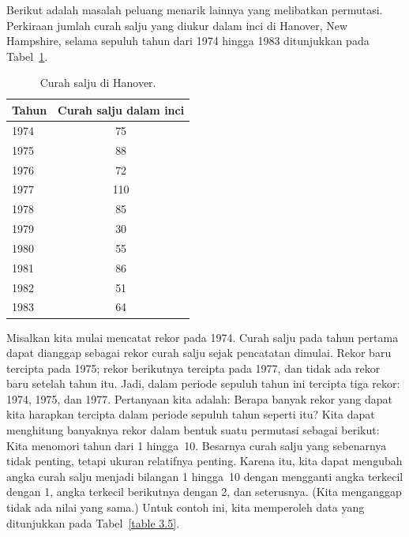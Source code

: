 Berikut adalah masalah peluang menarik lainnya yang melibatkan permutasi.  Perkiraan
jumlah curah salju yang diukur dalam inci di Hanover, New
Hampshire, selama sepuluh tahun dari 1974 hingga 1983 ditunjukkan pada
Tabel~\ref{table 3.4}.
\begin{table}
\centering
\begin{tabular}{lc} Tahun & Curah salju dalam inci \\ \hline
  1974  & \hspace{.1in}75   \\
  1975  & \hspace{.1in}88   \\
  1976  & \hspace{.1in}72   \\
  1977  & \hspace{.031in}110 \\
  1978  & \hspace{.1in}85   \\
  1979  & \hspace{.1in}30   \\
  1980  & \hspace{.1in}55   \\
  1981  & \hspace{.1in}86   \\
  1982  & \hspace{.1in}51   \\
  1983  & \hspace{.1in}64   \\
\end{tabular}
\caption{Curah salju di Hanover.}
\label{table 3.4}
\end{table}
Misalkan kita mulai mencatat rekor pada 1974.  Curah salju pada tahun pertama dapat
dianggap sebagai rekor curah salju sejak pencatatan dimulai.  Rekor baru tercipta pada
1975; rekor berikutnya tercipta pada 1977, dan tidak ada rekor baru setelah tahun itu.
Jadi, dalam periode sepuluh tahun ini tercipta tiga rekor: 1974, 1975, dan 1977.
Pertanyaan kita adalah: Berapa banyak rekor yang dapat kita harapkan tercipta dalam
periode sepuluh tahun seperti itu?  Kita dapat menghitung banyaknya rekor dalam bentuk
suatu permutasi sebagai berikut: Kita menomori tahun dari 1 hingga~10.  Besarnya curah
salju yang sebenarnya tidak penting, tetapi ukuran relatifnya penting.  Karena itu,
kita dapat mengubah angka curah salju menjadi bilangan 1 hingga~10 dengan mengganti
angka terkecil dengan 1, angka terkecil berikutnya dengan 2, dan seterusnya.  (Kita
menganggap tidak ada nilai yang sama.)  Untuk contoh ini, kita memperoleh data yang
ditunjukkan pada Tabel~\ref{table 3.5}.

